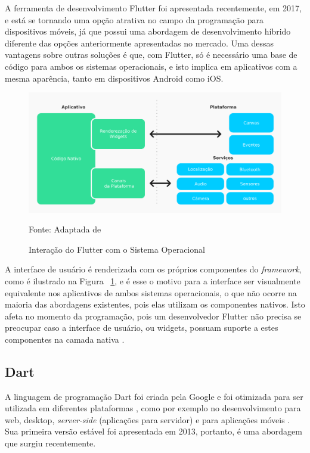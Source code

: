 A ferramenta de desenvolvimento Flutter foi apresentada recentemente, em 2017, e está se tornando uma opção atrativa no campo da programação para dispositivos móveis, já que possui uma abordagem de desenvolvimento híbrido diferente das opções anteriormente apresentadas no mercado. Uma dessas vantagens sobre outras soluções é que, com Flutter, só é necessário uma base de código para ambos os sistemas operacionais, e isto implica em aplicativos com a mesma aparência, tanto em dispositivos Android como iOS.



\begin{figure}[H]
    \centering
    \includegraphics[width=15cm]{imagens/interacaoFlutter.png}
    \caption{Interação do Flutter com o Sistema Operacional}
    Fonte: Adaptada de \cite{yatsenko2019comparative}
    \label{fig: Interação Flutter SO}
\end{figure}

A interface de usuário é renderizada com os próprios componentes do \textit{framework}, como é ilustrado na Figura ~\ref{fig: Interação Flutter SO}, e é esse o motivo para a interface ser visualmente equivalente nos aplicativos de ambos sistemas operacionais, o que não ocorre na maioria das abordagens existentes, pois elas utilizam os componentes nativos. Isto afeta no momento da programação, pois um desenvolvedor Flutter não precisa se preocupar caso a interface de usuário, ou widgets, possuam suporte a estes componentes na camada nativa \cite{zammetti2019practical}.

\subsection{Dart}

A linguagem de programação Dart foi criada pela Google e foi otimizada para ser utilizada em diferentes plataformas \cite{clow2019flutter}, como por exemplo no desenvolvimento para web, desktop, \textit{server-side} (aplicações para servidor) e para aplicações móveis \cite{biessek2019dart}. Sua primeira versão estável foi apresentada em 2013, portanto, é uma abordagem que surgiu recentemente.

